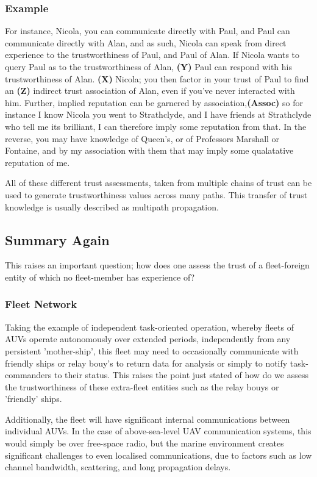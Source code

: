 \documentclass[oneside,11pt,a4paper]{Latex/Classes/PhDthesisPSnPDF}
\begin{document}
\begin{doublespace}
\subsubsection{Example}
For instance, Nicola, you can
communicate directly with Paul, and Paul can communicate directly with Alan, and
as such, Nicola can speak from direct experience to the trustworthiness of Paul,
and Paul of Alan. If Nicola wants to query Paul as to the trustworthiness of
Alan, \textbf{(Y)} Paul can respond with his trustworthiness of Alan.
\textbf{(X)} Nicola; you then factor in your trust of Paul to find an
\textbf{(Z)} indirect trust association of Alan, even if you've never interacted
with him. Further, implied reputation can be garnered by
association,\textbf{(Assoc)} so for instance I know Nicola you went to
Strathclyde, and I have friends at Strathclyde who tell me its brilliant, I can therefore imply some reputation from that. In the reverse, you may have knowledge  of Queen's, or of
Professors Marshall or Fontaine, and by my association with  them that may imply
some qualatative reputation of me.

All of these different trust assessments, taken from multiple chains of trust
can be used to generate trustworthiness values across many paths. This transfer
of trust knowledge is usually described as multipath propagation.

\subsection{Summary Again}
This raises an important question; how does one assess the trust of a
fleet-foreign entity of which no fleet-member has experience of?

\subsubsection{Fleet Network}  
Taking the example of independent task-oriented operation, whereby fleets of
AUVs operate autonomously over extended periods, independently from any
persistent 'mother-ship', this fleet may need to occasionally communicate with
friendly ships or relay bouy's to return data for analysis or simply to notify
task-commanders to their status. This raises the point just stated of how do we
assess the trustworthiness of these extra-fleet entities such as the relay bouys
or 'friendly' ships.


Additionally, the fleet will have significant internal communications between
individual AUVs. In the case of above-sea-level UAV communication systems, this
would simply be over free-space radio, but the marine environment creates
significant challenges to even localised communications, due to factors such as
low channel bandwidth, scattering, and long propagation delays.


\end{doublespace}
\end{document}
